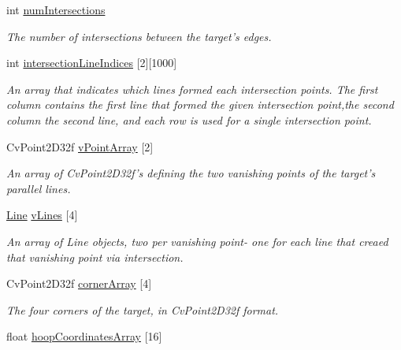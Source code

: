 \begin{DoxyCompactItemize}
int \hyperlink{classTarget_a8299a806d41327ee1827fc0f0b0b2131}{numIntersections}
\begin{DoxyCompactList}\small\item\em The number of intersections between the target's edges. \item\end{DoxyCompactList}\item 
int \hyperlink{classTarget_a8826919bae5e9653ab4c7b7ab6a4b03a}{intersectionLineIndices} \mbox{[}2\mbox{]}\mbox{[}1000\mbox{]}
\begin{DoxyCompactList}\small\item\em An array that indicates which lines formed each intersection points. The first column contains the first line that formed the given intersection point,the second column the second line, and each row is used for a single intersection point. \item\end{DoxyCompactList}\item 
CvPoint2D32f \hyperlink{classTarget_a55d4dc8c3f14d8229ee0d05fcebe0b42}{vPointArray} \mbox{[}2\mbox{]}
\begin{DoxyCompactList}\small\item\em An array of CvPoint2D32f's defining the two vanishing points of the target's parallel lines. \item\end{DoxyCompactList}\item 
\hyperlink{classLines_1_1Line}{Line} \hyperlink{classTarget_a5a19c47a5b28c7e2a1d2b2cb24b322a1}{vLines} \mbox{[}4\mbox{]}
\begin{DoxyCompactList}\small\item\em An array of Line objects, two per vanishing point-\/ one for each line that creaed that vanishing point via intersection. \item\end{DoxyCompactList}\item 
CvPoint2D32f \hyperlink{classTarget_aa77c3e5ee30ba4c31a6633f74b32f62f}{cornerArray} \mbox{[}4\mbox{]}
\begin{DoxyCompactList}\small\item\em The four corners of the target, in CvPoint2D32f format. \item\end{DoxyCompactList}\item 
float \hyperlink{classTarget_a6f52fbce823f229f68368c241dd39f46}{hoopCoordinatesArray} \mbox{[}16\mbox{]}
\end{DoxyCompactItemize}


